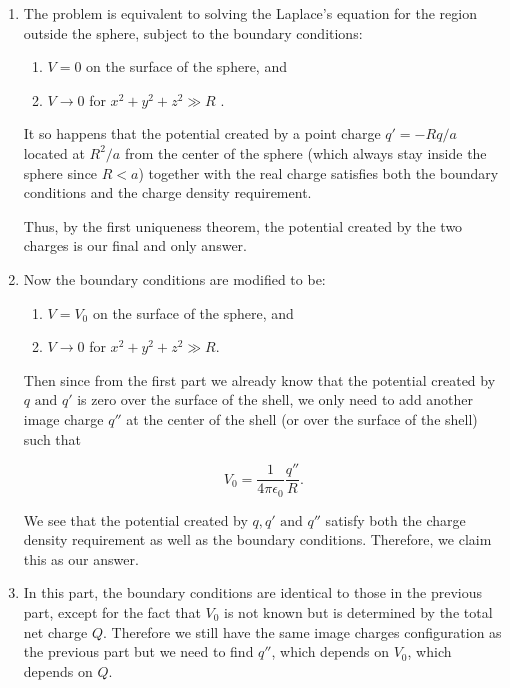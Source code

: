 \documentclass[english,a4paper,12pt]{report}
\begin{document}
{\begin{enumerate}
    \item The problem is equivalent to solving the Laplace's equation for the region outside the sphere, subject to the boundary conditions: 
    
    \begin{enumerate}[itemsep=10pt] 
        \item \(V = 0\) on the surface of the sphere, and
        \item \(V \rightarrow 0\) for  \(x^2 + y^2 + z^2 \gg R\) .		
    \end{enumerate} 
    
    It so happens that the potential created by a point charge \(q' = -Rq /a\) located at \(R^2 /a \) from the center of the sphere (which always stay inside the sphere since \(R < a\)) together with the real charge satisfies both the boundary conditions and the charge density requirement. 
    
    Thus, by the first uniqueness theorem, the potential created by the two charges is our final and only answer.\newline 
    
    \item Now the boundary conditions are modified to be:
    
    \begin{enumerate}
        \item \(V = V_0\) on the surface of the sphere, and
        \item \(V \rightarrow 0\) for \(x^2 + y^2 + z^2 \gg R\).	 
    \end{enumerate}
    
    Then since from the first part we already know that the potential created by \(q \text{ and } q'\) is zero over the surface of the shell, we only need to add another image charge \(q''\) at the center of the shell (or over the surface of the shell) such that 
    
    \begin{equation}
        V_0 = \frac{1}{4\pi\epsilon_0} \frac{q''}{R}.
    \end{equation}
    
    We see that the potential created by \(q, q' \text{ and } q''\) satisfy both the charge density requirement as well as the boundary conditions. Therefore, we claim this as our answer. \newline
    
    \item In this part, the boundary conditions are identical to those in the previous part, except for the fact that \(V_0\) is not known but is determined by the total net charge \(Q\). Therefore we still have the same image charges configuration as the previous part but we need to find \(q''\), which depends on \(V_0 \), which depends on \(Q\).  
    

\end{enumerate}}
\end{document}
